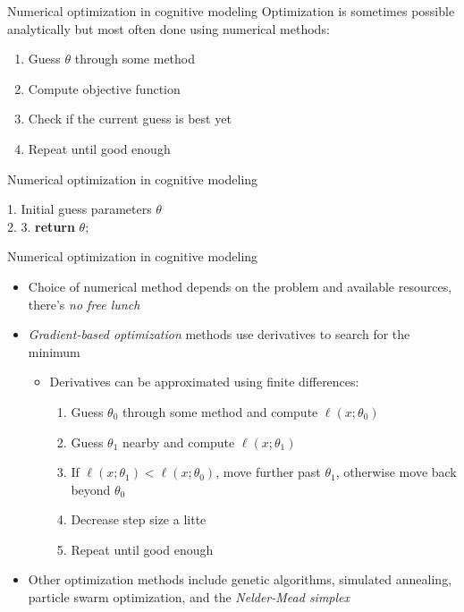\documentclass{beamer}
\begin{document}
\begin{frame}[fragile]{Numerical optimization in cognitive modeling}
  Optimization is sometimes possible analytically but most often done using numerical methods:
    \begin{enumerate}
      \item Guess $\theta$ through some method
      \item Compute objective function
      \item Check if the current guess is best yet
      \item Repeat until good enough
    \end{enumerate}
\end{frame}


\begin{frame}[fragile]{Numerical optimization in cognitive modeling}

\begin{algorithm}[H]
  \NoCaptionOfAlgo
  \caption{\textbf{Algorithm:} Abstract Numerical Minimization}
  1. Initial guess parameters $\theta$\\
  2. 
  3. \textbf{return} $\theta$;
\end{algorithm}

\end{frame}


\begin{frame}[fragile]{Numerical optimization in cognitive modeling}
  \begin{itemize}
     \item Choice of numerical method depends on the problem and available resources, there's \emph{no free lunch}
      \item \emph{Gradient-based optimization} methods use derivatives to search for the minimum
      \begin{itemize}
          \item Derivatives can be approximated using finite differences:
         \begin{enumerate}
           \item Guess $\theta_0$ through some method and compute $\ell(x;\theta_0)$
           \item Guess $\theta_1$ nearby and compute $\ell(x;\theta_1)$
           \item If $\ell(x;\theta_1) < \ell(x;\theta_0)$, move further past $\theta_1$, otherwise move back beyond $\theta_0$
           \item Decrease step size a litte
           \item Repeat until good enough
         \end{enumerate}
      \end{itemize}
      \item Other optimization methods include genetic algorithms, simulated annealing, particle swarm optimization, and the \emph{Nelder-Mead simplex}
  \end{itemize}
\end{frame}
\end{document}
